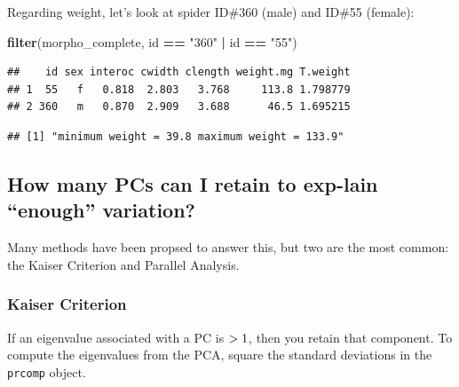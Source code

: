 \documentclass[]{article}
\newenvironment{Shaded}{\begin{snugshade}}{\end{snugshade}}
\newcommand{\DataTypeTok}[1]{\textcolor[rgb]{0.13,0.29,0.53}{#1}}
\newcommand{\KeywordTok}[1]{\textcolor[rgb]{0.13,0.29,0.53}{\textbf{#1}}}
\newcommand{\NormalTok}[1]{#1}
\newcommand{\OperatorTok}[1]{\textcolor[rgb]{0.81,0.36,0.00}{\textbf{#1}}}
\newcommand{\StringTok}[1]{\textcolor[rgb]{0.31,0.60,0.02}{#1}}
\begin{document}
Regarding weight, let's look at spider ID\#360 (male) and ID\#55
(female):

\begin{Shaded}
\begin{Highlighting}[]
\KeywordTok{filter}\NormalTok{(morpho_complete, id }\OperatorTok{==}\StringTok{ "360"} \OperatorTok{|}\StringTok{ }\NormalTok{id }\OperatorTok{==}\StringTok{ "55"}\NormalTok{)}
\end{Highlighting}
\end{Shaded}

\begin{verbatim}
##    id sex interoc cwidth clength weight.mg T.weight
## 1  55   f   0.818  2.803   3.768     113.8 1.798779
## 2 360   m   0.870  2.909   3.688      46.5 1.695215
\end{verbatim}

\begin{Shaded}
\end{Shaded}

\begin{verbatim}
## [1] "minimum weight = 39.8 maximum weight = 133.9"
\end{verbatim}

\hypertarget{how-many-pcs-can-i-retain-to-exp-lain-enough-variation}{%
\subsection{How many PCs can I retain to exp-lain ``enough''
variation?}\label{how-many-pcs-can-i-retain-to-exp-lain-enough-variation}}

Many methods have been propsed to answer this, but two are the most
common: the Kaiser Criterion and Parallel Analysis.

\hypertarget{kaiser-criterion}{%
\subsubsection{Kaiser Criterion}\label{kaiser-criterion}}

If an eigenvalue associated with a PC is \(\small >1\), then you retain
that component. To compute the eigenvalues from the PCA, square the
standard deviations in the \texttt{prcomp} object.
\end{document}
